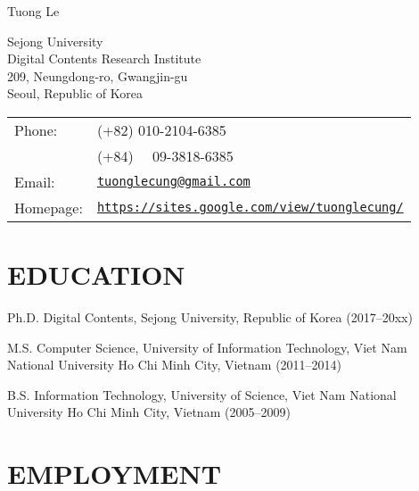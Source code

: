 \documentclass[letterpaper]{article}
\def\name{Tuong Le}
\renewenvironment{itemize}{
  \begin{list}{}{
    \setlength{\leftmargin}{1.5em}
  }
}{
  \end{list}
}
\begin{document}
{\huge \name}


\vspace{0.25in}

\begin{minipage}{0.45\linewidth}
  Sejong University \\
  Digital Contents Research Institute \\
  209, Neungdong-ro, Gwangjin-gu \\
  Seoul, Republic of Korea
\end{minipage}
\begin{minipage}{0.45\linewidth}
  \begin{tabular}{ll}
    Phone: & (+82) 010-2104-6385 \\
    	   & (+84) ~~09-3818-6385 \\
    Email: & \href{mailto:tuonglecung@gmail.com}{\tt tuonglecung@gmail.com} \\
    Homepage: & \href{https://sites.google.com/view/tuonglecung/}{\tt https://sites.google.com/view/tuonglecung/} \\
  \end{tabular}
\end{minipage}


\section*{EDUCATION}

\begin{itemize}

  \item Ph.D. Digital Contents, Sejong University, Republic of Korea (2017--20xx)

  \item M.S. Computer Science, University of Information Technology, Viet Nam National University Ho Chi Minh City, Vietnam (2011--2014)
  
  \item B.S. Information Technology, University of Science, Viet Nam National University Ho Chi Minh City, Vietnam (2005--2009)

\end{itemize}


\section*{EMPLOYMENT}
\end{document}
